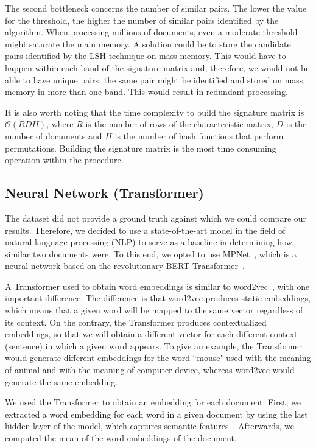 \documentclass[runningheads]{llncs}
\begin{document}
The second bottleneck concerns the number of similar pairs. The lower the value for the threshold, the higher the number of similar pairs identified by the algorithm. When processing millions of documents, even a moderate threshold might saturate the main memory. A solution could be to store the candidate pairs identified by the LSH technique on mass memory. This would have to happen within each band of the signature matrix and, therefore, we would not be able to have unique pairs: the same pair might be identified and stored on mass memory in more than one band. This would result in redundant processing.

It is also worth noting that the time complexity to build the signature matrix is $\mathcal{O}(R D H)$, where $R$ is the number of rows of the characteristic matrix, $D$ is the number of documents and $H$ is the number of hash functions that perform permutations. Building the signature matrix is the most time consuming operation within the procedure.

\subsection{Neural Network (Transformer)}
\label{subsec:models:transformer}

The dataset did not provide a ground truth against which we could compare our results. Therefore, we decided to use a state-of-the-art model in the field of natural language processing (NLP) to serve as a baseline in determining how similar two documents were. To this end, we opted to use MPNet~\cite{song_2020}, which is a neural network based on the revolutionary BERT Transformer~\cite{vaswani_2017, devlin-etal-2019-bert}.

A Transformer used to obtain word embeddings is similar to word2vec~\cite{mikolov-etal-2013-word2vec}, with one important difference. The difference is that word2vec produces static embeddings, which means that a given word will be mapped to the same vector regardless of its context. On the contrary, the Transformer produces contextualized embeddings, so that we will obtain a different vector for each different context (sentence) in which a given word appears. To give an example, the Transformer would generate different embeddings for the word “mouse" used with the meaning of animal and with the meaning of computer device, whereas word2vec would generate the same embedding.

We used the Transformer to obtain an embedding for each document. First, we extracted a word embedding for each word in a given document by using the last hidden layer of the model, which captures semantic features~\cite{laicher-etal-2021-explaining}. Afterwards, we computed the mean of the word embeddings of the document.
\end{document}
